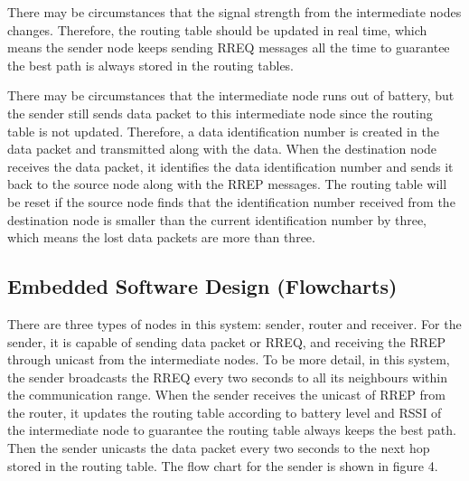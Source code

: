 \documentclass[a4paper]{article}
\begin{document}
There may be circumstances that the signal strength from the intermediate nodes changes. Therefore, the routing table should be updated in real time, which means the sender node keeps sending RREQ messages all the time to guarantee the best path is always stored in the routing tables.

There may be circumstances that the intermediate node runs out of battery, but the sender still sends data packet to this intermediate node since the routing table is not updated. Therefore, a data identification number is created in the data packet and transmitted along with the data. When the destination node receives the data packet, it identifies the data identification number and sends it back to the source node along with the RREP messages. The routing table will be reset if the source node finds that the identification number received from the destination node is smaller than the current identification number by three, which means the lost data packets are more than three.


\subsection{Embedded Software Design (Flowcharts)}

There are three types of nodes in this system: sender, router and receiver. For the sender, it is capable of sending data packet or RREQ, and receiving the RREP through unicast from the intermediate nodes.
To be more detail, in this system, the sender broadcasts the RREQ every two seconds to all its neighbours within the communication range. When the sender receives the unicast of RREP from the router, it updates the routing table according to battery level and RSSI of the intermediate node to guarantee the routing table always keeps the best path. Then the sender unicasts the data packet every two seconds to the next hop stored in the routing table. The flow chart for the sender is shown in figure 4.
\end{document}
